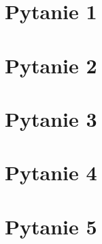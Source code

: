 \documentclass[12pt, a4paper, polish, openany]{book}
\begin{document}
\frontmatter



\tableofcontents


\titleformat{\chapter}[display]{\normalfont\Huge\bfseries}{}{0pt}{\Huge}
\titlespacing*{\chapter}{0pt}{0pt}{20pt}

\newenvironment{questiontext}
{
	\vspace{1em}
	\begin{center}
		\begin{minipage}{0.9\textwidth}
			\fontsize{14}{14}\selectfont
			\setlength{\parskip}{1em}
			}
			{
		\end{minipage}
	\end{center}
	\vspace{2em}
	\hrule height 0.5pt
	\vspace{2em}
}

\mainmatter

\chapter{Pytanie 1}


\chapter{Pytanie 2}


\chapter{Pytanie 3}


\chapter{Pytanie 4}


\chapter{Pytanie 5}

\end{document}
